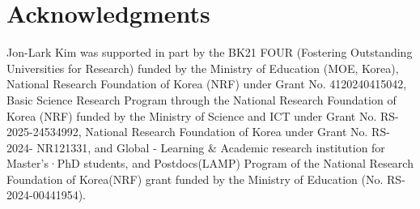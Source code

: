 \documentclass{article}
\theoremstyle{definition}
\theoremstyle{remark}
\begin{document}
\section*{Acknowledgments}
Jon-Lark Kim was supported in part by the BK21 FOUR (Fostering Outstanding Universities for Research) funded by the Ministry of Education (MOE, Korea), National Research Foundation of Korea (NRF) under Grant No. 4120240415042, Basic Science Research Program through the National Research Foundation of Korea (NRF) funded by the Ministry of Science and ICT under Grant No. RS-2025-24534992, National Research Foundation of Korea under Grant No. RS-2024- NR121331, and Global - Learning \& Academic research institution for Master’s·PhD students, and Postdocs(LAMP) Program of the National Research Foundation of Korea(NRF) grant funded by the Ministry of Education (No. RS-2024-00441954).
\end{document}
